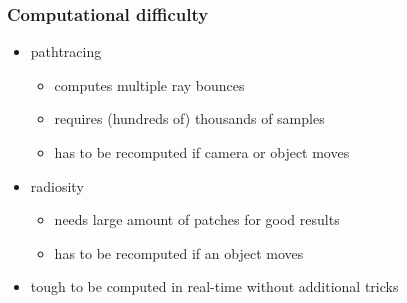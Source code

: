 \documentclass[aspectratio=169]{beamer}
\begin{document}
	\begin{frame}
		\frametitle{Computational difficulty}
		\begin{itemize}
			\item pathtracing 
				\begin{itemize}
					\item computes multiple ray bounces
					\item requires (hundreds of) thousands of samples 
					\item has to be recomputed if camera or object moves
				\end{itemize}
			\item radiosity
				\begin{itemize}
					\item needs large amount of patches for good results
					\item has to be recomputed if an object moves
				\end{itemize}
			\item tough to be computed in real-time without additional tricks
		\end{itemize}
	\end{frame}
\end{document}
